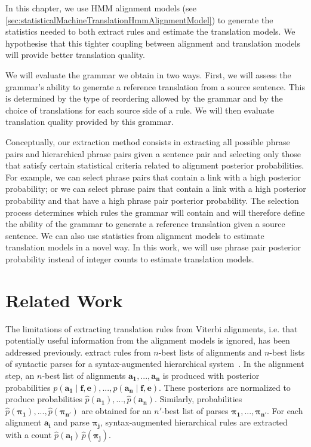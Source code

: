In this chapter, we use HMM alignment
models (see \autoref{sec:statisticalMachineTranslationHmmAlignmentModel}) to
generate the statistics needed to both extract rules and estimate the
translation models. We hypothesise that this tighter coupling between alignment
and translation models will provide better translation quality.

We will evaluate the grammar we obtain in two ways. First, we will assess the
grammar's ability to generate a reference translation from a source sentence.
This is determined by the type of reordering allowed by the grammar and by
the choice of translations for each source side of a rule. We will then evaluate
translation quality provided by this grammar.

Conceptually, our extraction method consists in extracting all possible phrase
pairs and hierarchical phrase pairs given a sentence pair and selecting only
those that satisfy certain statistical criteria related to alignment posterior
probabilities. For example, we can select phrase pairs that contain a link with
a high posterior probability; or we can select phrase pairs that contain a link
with a high posterior probability and that have a high phrase pair posterior
probability. The selection process determines which rules the grammar will
contain and will therefore define the ability of the grammar to generate a
reference translation given a source sentence. We can also use statistics from
alignment models to estimate translation models in a novel way. In this work, we
will use phrase pair posterior probability instead of integer counts to estimate
translation models.

\section{Related Work}
\label{sec:extractionFromPosteriorRelated}

The limitations of extracting translation rules from Viterbi alignments, i.e.
that potentially useful information from the alignment models is ignored, has
been addressed previously. \citet{venugopal-zollmann-smith-vogel:2008:AMTA}
extract rules from
$n$-best lists of alignments and $n$-best lists of syntactic parses for a
syntax-augmented hierarchical system~\citep{zollmann-venugopal:2006:WMT}.
In the alignment step, an $n$-best list of alignments $\bm{a_1}, ..., \bm{a_n}$ is
produced with posterior probabilities
$p(\bm{a_1} \mid \bm{f}, \bm{e}), ..., p(\bm{a_n} \mid \bm{f}, \bm{e})$. These
posteriors are normalized to produce probabilities
$\hat{p}(\bm{a_1}), ..., \hat{p}(\bm{a_n})$. Similarly, probabilities
$\hat{p}(\bm{\pi_1}), ..., \hat{p}(\bm{\pi_{n'}})$ are obtained
for an $n'$-best list of parses $\bm{\pi_1}, ..., \bm{\pi_{n'}}$. For each alignment
$\bm{a_i}$ and parse $\bm{\pi_j}$, syntax-augmented hierarchical rules are extracted
with a count $\hat{p}(\bm{a_i}) \, \hat{p}(\bm{\pi_j})$.

